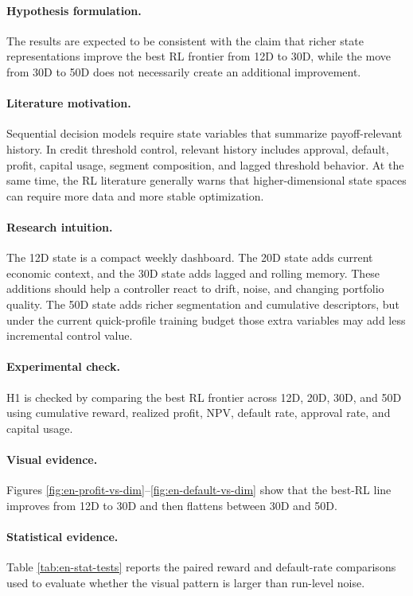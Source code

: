 \documentclass[12pt,a4paper]{article}
\begin{document}
\paragraph{Hypothesis formulation.}
The results are expected to be consistent with the claim that richer state representations improve the best RL frontier from 12D to 30D, while the move from 30D to 50D does not necessarily create an additional improvement.

\paragraph{Literature motivation.}
Sequential decision models require state variables that summarize payoff-relevant history. In credit threshold control, relevant history includes approval, default, profit, capital usage, segment composition, and lagged threshold behavior. At the same time, the RL literature generally warns that higher-dimensional state spaces can require more data and more stable optimization.

\paragraph{Research intuition.}
The 12D state is a compact weekly dashboard. The 20D state adds current economic context, and the 30D state adds lagged and rolling memory. These additions should help a controller react to drift, noise, and changing portfolio quality. The 50D state adds richer segmentation and cumulative descriptors, but under the current quick-profile training budget those extra variables may add less incremental control value.

\paragraph{Experimental check.}
H1 is checked by comparing the best RL frontier across 12D, 20D, 30D, and 50D using cumulative reward, realized profit, NPV, default rate, approval rate, and capital usage.

\paragraph{Visual evidence.}
Figures \ref{fig:en-profit-vs-dim}--\ref{fig:en-default-vs-dim} show that the best-RL line improves from 12D to 30D and then flattens between 30D and 50D.

\paragraph{Statistical evidence.}
Table \ref{tab:en-stat-tests} reports the paired reward and default-rate comparisons used to evaluate whether the visual pattern is larger than run-level noise.
\end{document}
